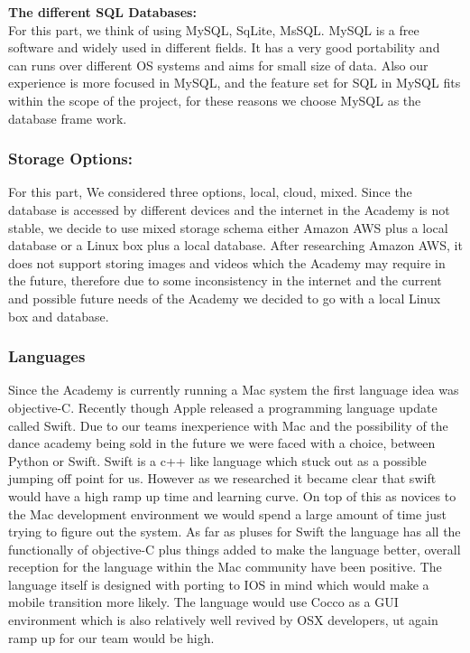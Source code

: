 \textbf{The different SQL Databases:}\\
For this part, we think of using MySQL, SqLite, MsSQL. MySQL is a free software and widely used in different fields. It has a very good portability and can runs over different OS systems and aims for small size of data. Also our experience is more focused in MySQL, and the feature set for SQL in MySQL fits within the scope of the project, for these reasons we choose MySQL as the database frame work.

\subsubsection{Storage Options:}
For this part, We considered three options, local, cloud, mixed. Since the database is accessed by different devices and the internet in the Academy is not stable, we decide to use mixed storage schema either Amazon AWS plus a local database or a Linux box plus a local database. After researching Amazon AWS, it does not support storing images and videos which the Academy may require in the future, therefore   due to some inconsistency in the internet and the current and possible future needs of the Academy we decided to go with a local Linux box and database.\\

\subsubsection{Languages}
Since the Academy is currently running a Mac system the first language idea was objective-C. Recently though Apple released a programming language update called Swift. Due to our teams inexperience with Mac and the possibility of the dance academy being sold in the future we were faced with a choice, between Python or Swift. Swift is a c++ like language which stuck out as a possible jumping off point for us. However as we researched it became clear that swift would have a high ramp up time and learning curve. On top of this as novices to the Mac development environment we would spend a large amount of time just trying to figure out the system. As far as pluses for Swift the language has all the functionally of objective-C plus things added to make the language better, overall reception for the language within the Mac community have been positive. The language itself is designed with porting to IOS in mind which would make a mobile transition more likely. The language would use Cocco as a GUI environment which is also relatively well revived by OSX developers, ut again ramp up for our team would be high.

